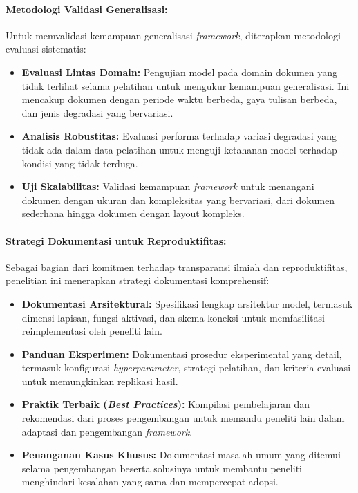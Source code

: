 \documentclass[12pt,a4paper]{article}
\begin{document}
\paragraph{Metodologi Validasi Generalisasi:}
Untuk memvalidasi kemampuan generalisasi \textit{framework}, diterapkan metodologi evaluasi sistematis:

\begin{itemize}[leftmargin=*, nosep]
\item \textbf{Evaluasi Lintas Domain:} Pengujian model pada domain dokumen yang tidak terlihat selama pelatihan untuk mengukur kemampuan generalisasi. Ini mencakup dokumen dengan periode waktu berbeda, gaya tulisan berbeda, dan jenis degradasi yang bervariasi.

\item \textbf{Analisis Robustitas:} Evaluasi performa terhadap variasi degradasi yang tidak ada dalam data pelatihan untuk menguji ketahanan model terhadap kondisi yang tidak terduga.

\item \textbf{Uji Skalabilitas:} Validasi kemampuan \textit{framework} untuk menangani dokumen dengan ukuran dan kompleksitas yang bervariasi, dari dokumen sederhana hingga dokumen dengan layout kompleks.
\end{itemize}

\paragraph{Strategi Dokumentasi untuk Reproduktifitas:}
Sebagai bagian dari komitmen terhadap transparansi ilmiah dan reproduktifitas, penelitian ini menerapkan strategi dokumentasi komprehensif:

\begin{itemize}[leftmargin=*, nosep]
\item \textbf{Dokumentasi Arsitektural:} Spesifikasi lengkap arsitektur model, termasuk dimensi lapisan, fungsi aktivasi, dan skema koneksi untuk memfasilitasi reimplementasi oleh peneliti lain.

\item \textbf{Panduan Eksperimen:} Dokumentasi prosedur eksperimental yang detail, termasuk konfigurasi \textit{hyperparameter}, strategi pelatihan, dan kriteria evaluasi untuk memungkinkan replikasi hasil.

\item \textbf{Praktik Terbaik (\textit{Best Practices}):} Kompilasi pembelajaran dan rekomendasi dari proses pengembangan untuk memandu peneliti lain dalam adaptasi dan pengembangan \textit{framework}.

\item \textbf{Penanganan Kasus Khusus:} Dokumentasi masalah umum yang ditemui selama pengembangan beserta solusinya untuk membantu peneliti menghindari kesalahan yang sama dan mempercepat adopsi.
\end{itemize}
\end{document}
